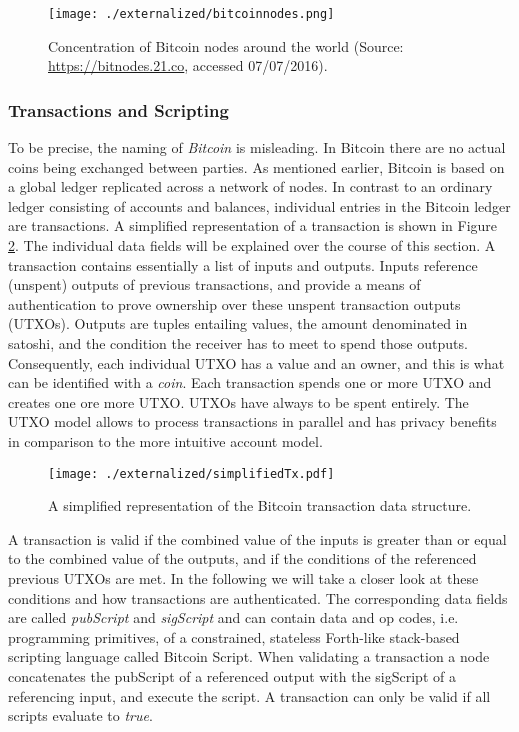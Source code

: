 \begin{figure}
\centering
\texttt{[image: ./externalized/bitcoinnodes.png]}
\caption{Concentration of Bitcoin nodes around the world (Source: \url{https://bitnodes.21.co}, accessed 07/07/2016).}
\label{fig:bitcointx}
\end{figure}


\subsubsection{Transactions and Scripting}
\label{sec:tx}

To be precise, the naming of \emph{Bitcoin} is misleading. In Bitcoin there are no actual coins being exchanged between parties. As mentioned earlier, Bitcoin is based on a global ledger replicated across a network of nodes. In contrast to an ordinary ledger consisting of accounts and balances, individual entries in the Bitcoin ledger are transactions. A simplified representation of a transaction is shown in Figure \ref{fig:bitcointx}. The individual data fields will be explained over the course of this section.
 A transaction contains essentially a list of inputs and outputs. Inputs reference (unspent) outputs of previous transactions, and provide a means of authentication to prove ownership over these unspent transaction outputs (UTXOs). Outputs are tuples entailing values, the amount denominated in satoshi, and the condition the receiver has to meet to spend those outputs. Consequently, each individual UTXO has a value and an owner, and this is what can be identified with a \emph{coin}. Each transaction spends one or more UTXO and creates one ore more UTXO. UTXOs have always to be spent entirely. The UTXO model allows to process transactions in parallel and has privacy benefits in comparison to the more intuitive account model\parencite{buterin2016utxo}.

\begin{figure}
\centering
\texttt{[image: ./externalized/simplifiedTx.pdf]}
\caption{A simplified representation of the Bitcoin transaction data structure.}
\label{fig:bitcointx}
\end{figure}

A transaction is valid if the combined value of the inputs is greater than or equal to the combined value of the outputs, and if the conditions of the referenced previous UTXOs are met.
In the following we will take a closer look at these conditions and how transactions are authenticated. The corresponding data fields are called \emph{pubScript} and \emph{sigScript} and can contain data and op codes, i.e. programming primitives, of a constrained, stateless Forth-like stack-based scripting language called Bitcoin Script. 
When validating a transaction a node concatenates the pubScript of a referenced output with the sigScript of a referencing input, and execute the script. A transaction can only be valid if all scripts evaluate to \emph{true}. 

